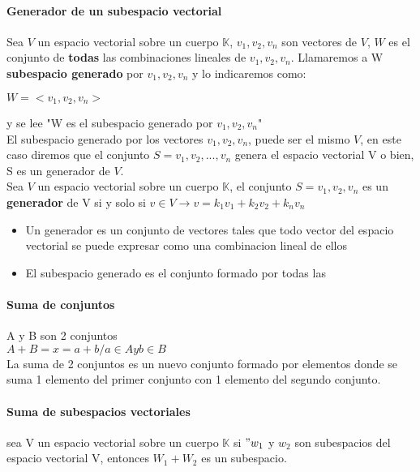 \documentclass[10pt]{article}
\begin{document}
\paragraph{Generador de un subespacio vectorial} Sea $V$ un espacio vectorial sobre un cuerpo $\mathbb{K}$,
$v_1, v_2, v_n$ son vectores de $V$, $W$ es el conjunto de \textbf{todas} las combinaciones lineales de $v_1, v_2, v_n$.
Llamaremos a W \textbf{subespacio generado} por $v_1,v_2, v_n$ y lo indicaremos como:
\begin{center}
	$W = <v_1, v_2, v_n>$
\end{center}

y se lee "W es el subespacio generado por $v_1, v_2, v_n$"\\
\linebreak
El subespacio generado por los vectores $v_1, v_2, v_n$, puede ser el mismo $V$, en este caso diremos que el conjunto $S = {v_1, v_2,..., v_n}$ genera el espacio vectorial V o bien, S es un generador de $V$.\\
\linebreak
Sea $V$ un espacio vectorial sobre un cuerpo $\mathbb{K}$, el conjunto $S = {v_1, v_2, v_n}$ es un \textbf{generador} de V si y solo si $v \in V \rightarrow v = k_1v_1 + k_2v_2 + k_nv_n$

\begin{itemize}
	\item Un generador es un conjunto de vectores tales que todo vector del espacio vectorial se puede expresar como una combinacion lineal de ellos
	\item El subespacio generado es el conjunto formado por todas las 
\end{itemize}

\paragraph{Suma de conjuntos}
A y B son 2 conjuntos\\
$A+B = {x=a+b / a \in A y b \in B}$\\

La suma de 2 conjuntos es un nuevo conjunto formado por elementos donde se suma 1 elemento del primer conjunto con 1 elemento del segundo conjunto.

\paragraph{Suma de subespacios vectoriales}
sea V un espacio vectorial sobre un cuerpo $\mathbb{K}$ si $"w_1$ y $w_2$ son subespacios del espacio vectorial V, entonces $W_1 + W_2$ es un subespacio.
\end{document}
